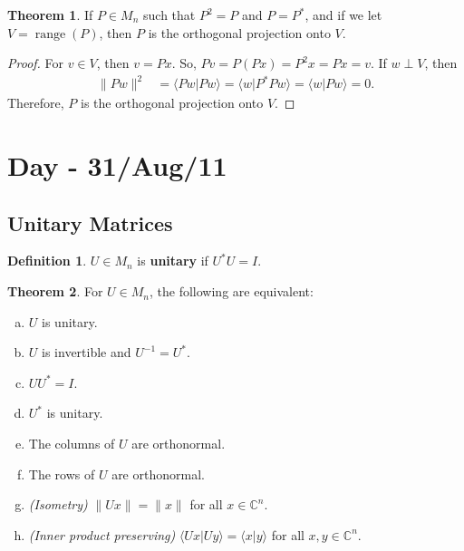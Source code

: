 \documentclass[12pt]{article}
\theoremstyle{definition}
\newtheorem*{theorem}{Theorem}
\newtheorem*{definition}{Definition}
\newcommand{\braket}[2]{\langle #1|#2\rangle}
\newcommand{\norm}[1]{\|#1\|}
\DeclareMathOperator{\range}{range}
\newcommand{\C}{\mathbb{C}}
\begin{document}
\begin{theorem}
If $P \in M_n$ such that $P^2 = P$ and $P = P^*$, and if we let $V = \range(P)$, then $P$ is the orthogonal projection onto $V$.
\end{theorem}

\begin{proof}
For $v \in V$, then $v = Px$. So, $Pv = P(Px) = P^2 x = Px = v$. If $w \perp V$, then
\begin{align*}
\norm{Pw}^2 &= \braket{Pw}{Pw} = \braket{w}{P^*Pw} = \braket{w}{Pw} = 0.
\end{align*}
Therefore, $P$ is the orthogonal projection onto $V$.
\end{proof}

\section{Day - 31/Aug/11}

\subsection{Unitary Matrices}

\begin{definition}
$U \in M_n$ is \textbf{unitary} if $U^*U = I$.
\end{definition}

\begin{theorem}
For $U \in M_n$, the following are equivalent:
\begin{enumerate}[(a)]
\item $U$ is unitary.
\item $U$ is invertible and $U^{-1} = U^*$.
\item $UU^* = I$.
\item $U^*$ is unitary.
\item The columns of $U$ are orthonormal.
\item The rows of $U$ are orthonormal.
\item \textit{(Isometry)} $\norm{Ux} = \norm{x}$ for all $x \in \C^n$.
\item \textit{(Inner product preserving)} $\braket{Ux}{Uy} = \braket{x}{y}$ for all $x, y \in \C^n$.
\end{enumerate}
\end{theorem}
\end{document}
